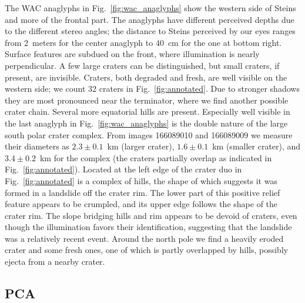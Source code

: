 \documentclass[preprint,3p,authoryear]{elsarticle}
\begin{document}
The WAC anaglyphs in Fig.~\ref{fig:wac_anaglyphs} show the western side of Steins and more of the frontal part. The anaglyphs have different perceived depths due to the different stereo angles; the distance to Steins perceived by our eyes ranges from 2~meters for the center anaglyph to 40~cm for the one at bottom right. Surface features are subdued on the front, where illumination is nearly perpendicular. A few large craters can be distinguished, but small craters, if present, are invisible. Craters, both degraded and fresh, are well visible on the western side; we count 32 craters in Fig.~\ref{fig:annotated}. Due to stronger shadows they are most pronounced near the terminator, where we find another possible crater chain. Several more equatorial hills are present. Especially well visible in the last anaglyph in Fig.~\ref{fig:wac_anaglyphs} is the double nature of the large south polar crater complex. From images 166089010 and 166089009 we measure their diameters as $2.3\pm0.1$~km (larger crater), $1.6\pm0.1$~km (smaller crater), and $3.4\pm0.2$~km for the complex (the craters partially overlap as indicated in Fig.~\ref{fig:annotated}). Located at the left edge of the crater duo in Fig.~\ref{fig:annotated} is a complex of hills, the shape of which suggests it was formed in a landslide off the crater rim. The lower part of this positive relief feature appears to be crumpled, and its upper edge follows the shape of the crater rim. The slope bridging hills and rim appears to be devoid of craters, even though the illumination favors their identification, suggesting that the landslide was a relatively recent event. Around the north pole we find a heavily eroded crater and some fresh ones, one of which is partly overlapped by hills, possibly ejecta from a nearby crater.

\subsection{PCA}
\end{document}
